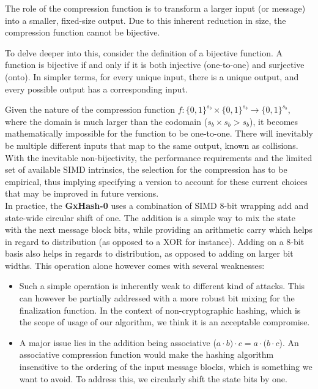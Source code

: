 \documentclass[10pt]{article}
\begin{document}
The role of the compression function is to transform a larger input (or message) into a smaller, fixed-size output. Due to this inherent reduction in size, the compression function cannot be bijective.

To delve deeper into this, consider the definition of a bijective function. A function is bijective if and only if it is both injective (one-to-one) and surjective (onto). In simpler terms, for every unique input, there is a unique output, and every possible output has a corresponding input.

Given the nature of the compression function \( f: \{0,1\}^{s_b} \times \{0,1\}^{s_b} \to \{0,1\}^{s_b} \), where the domain is much larger than the codomain (\( s_b \times s_b > s_b \)), it becomes mathematically impossible for the function to be one-to-one. There will inevitably be multiple different inputs that map to the same output, known as collisions.\\

With the inevitable non-bijectivity, the performance requirements and the limited set of available SIMD intrinsics, the selection for the compression has to be empirical, thus implying specifying a version to account for these current choices that may be improved in future versions.\\

In practice, the \textbf{GxHash-0} uses a combination of SIMD 8-bit wrapping add and state-wide circular shift of one. The addition is a simple way to mix the state with the next message block bits, while providing an arithmetic carry which helps in regard to distribution (as opposed to a XOR for instance). Adding on a 8-bit basis also helps in regards to distribution, as opposed to adding on larger bit widths. This operation alone however comes with several weaknesses:
\begin{itemize}
\item Such a simple operation is inherently weak to different kind of attacks. This can however be partially addressed with a more robust bit mixing for the finalization function. In the context of non-cryptographic hashing, which is the scope of usage of our algorithm, we think it is an acceptable compromise.
\item A major issue lies in the addition being associative (\(a \cdot b) \cdot c = a \cdot (b \cdot c \)). An associative compression function would make the hashing algorithm insensitive to the ordering of the input message blocks, which is something we want to avoid. To address this, we circularly shift the state bits by one.
\end{itemize}
\end{document}

